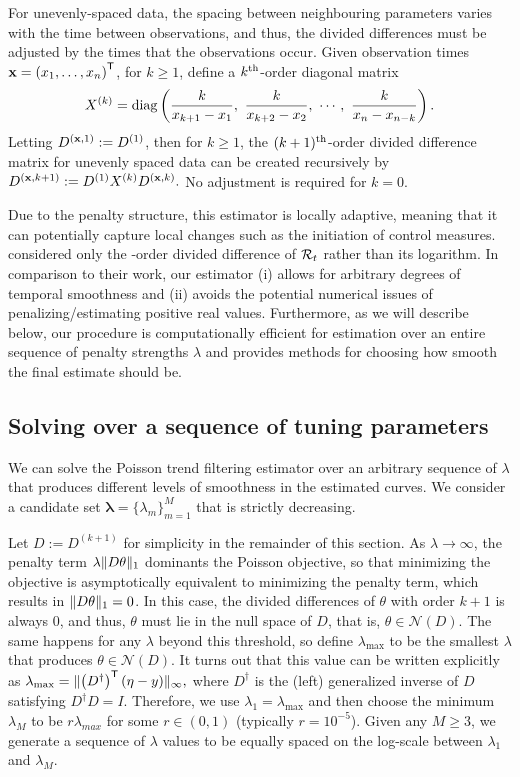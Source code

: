 For unevenly-spaced data, the spacing between neighbouring parameters
varies with the time between observations, and thus, the divided differences
must be adjusted by the times that the observations occur. Given observation
times $\mathbf{x} = {(x_1,\dots,x_n)}^{\mathsf{T}}$, for $k \geq 1$, define a $k^{\textnormal{th}}$-order
diagonal matrix $$X^{(k)} = \operatorname*{diag} \left(\frac{k}{x_{k+1} - x_1},\ \frac{k}{x_{k+2}
- x_2},\ \cdots,\ \frac{k}{x_n - x_{n-k}} \right).$$ Letting $D^{(\mathbf{x},1)} := D^{(1)}$,
then for $k\geq 1$, the $(k+1)^{\textnormal{th}}$-order divided difference matrix for unevenly
spaced data can be created recursively by
$D^{(\mathbf{x}, k+1)} := D^{(1)} X^{(k)} D^{(\mathbf{x},k)}.$ No adjustment is required
for $k=0$. 


Due to the penalty structure, this estimator is locally adaptive,
meaning that it can potentially capture local changes such as the initiation of
control measures. \cite{abry2020spatial,pascal2022nonsmooth} considered only the
\second-order divided difference of $\mathcal{R}_t$ rather than its logarithm. In
comparison to their work, our estimator (i) allows for arbitrary degrees of
temporal smoothness and (ii) avoids the potential numerical issues of
penalizing/estimating positive real values. Furthermore, as we will describe
below, our procedure is computationally efficient for estimation over an entire
sequence of penalty strengths $\lambda$ and provides methods for choosing how
smooth the final estimate should be.


\subsection{Solving over a sequence of tuning parameters}
\label{sec:candidate-set}

We can solve the Poisson trend filtering estimator over an arbitrary sequence of 
$\lambda$ that produces different levels of smoothness in the estimated curves. 
We consider a candidate set $\boldsymbol{\lambda} = \{\lambda_m\}_{m=1}^M$
that is strictly decreasing.


Let $D := D^{(k+1)}$ for simplicity in the remainder of this section. As
$\lambda \to\infty$, the penalty term $\lambda \lVert D\theta \rVert_1$ dominants the
Poisson objective, so that minimizing the objective is asymptotically equivalent
to minimizing the penalty term, which results in $\lVert D\theta \rVert_1 = 0$. In
this case, the divided differences of $\theta$ with order $k+1$ is always $0$,
and thus, $\theta$ must lie in the null space of $D$, that is,
$\theta\in\mathcal{N}(D)$. The same happens for any $\lambda$ beyond this
threshold, so define $\lambda_{\textrm{max}}$ to be the smallest $\lambda$ that
produces $\theta\in\mathcal{N}(D)$. It turns out that this value can be written
explicitly as $\lambda_{\textrm{max}} = \lVert \left(D^{\dagger}\right)^{\mathsf{T}} \left(\eta
- y\right) \rVert_{\infty},$ where $D^{\dagger}$ is the (left) generalized inverse of $D$
satisfying $D^{\dagger} D = I$. Therefore, we use $\lambda_1 =
\lambda_{\textrm{max}}$ and then choose the minimum $\lambda_M$ to be
$r\lambda_{max}$ for some $r \in (0,1)$ (typically $r=10^{-5}$). Given any
$M\geq 3$, we generate a sequence of $\lambda$ values to be equally spaced on
the log-scale between $\lambda_1$ and $\lambda_M$. 

